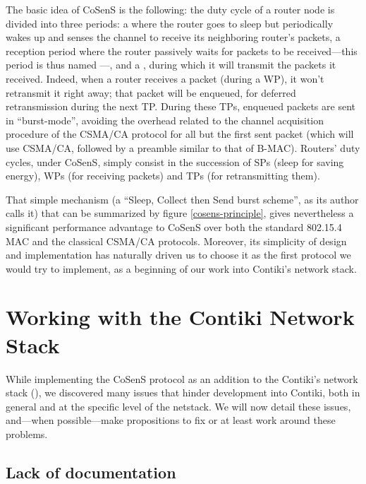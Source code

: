 \documentclass[12pt,twoside,a4paper]{article}
\begin{document}
The basic idea of CoSenS is the following: the duty cycle of a router node
is divided into three periods: a  where the router
goes to sleep but periodically wakes up and senses the channel to receive
its neighboring router's packets, a reception period where the router
passively waits for packets to be received---this period is thus named
---, and a , during
which it will transmit the packets it received. Indeed, when a router
receives a packet (during a WP), it won't retransmit it right away;
that packet will be enqueued, for deferred retransmission during
the next TP. During these TPs, enqueued packets are sent in ``burst-mode'',
avoiding the overhead related to the channel acquisition procedure of the
CSMA/CA protocol for all but the first sent packet (which will use CSMA/CA,
followed by a preamble similar to that of B-MAC). Routers' duty cycles,
under CoSenS, simply consist in the succession of SPs (sleep for saving
energy), WPs (for receiving packets) and TPs (for retransmitting them).

That simple mechanism (a ``Sleep, Collect then Send burst scheme'', as its
author calls it) that can be summarized by figure \ref{cosens-principle},
gives nevertheless a significant performance advantage to CoSenS over
both the standard 802.15.4 MAC and the classical CSMA/CA protocols.
Moreover, its simplicity of design and implementation has naturally
driven us to choose it as the first protocol we would try to implement,
as a beginning of our work into Contiki's network stack.


\section{Working with the Contiki Network Stack}

While implementing the CoSenS protocol as an addition to the Contiki's
network stack (), we discovered many issues that
hinder development into Contiki, both in general and at the specific level
of the netstack. We will now detail these issues, and---when possible---make
propositions to fix or at least work around these problems.


\subsection{Lack of documentation}
\end{document}
